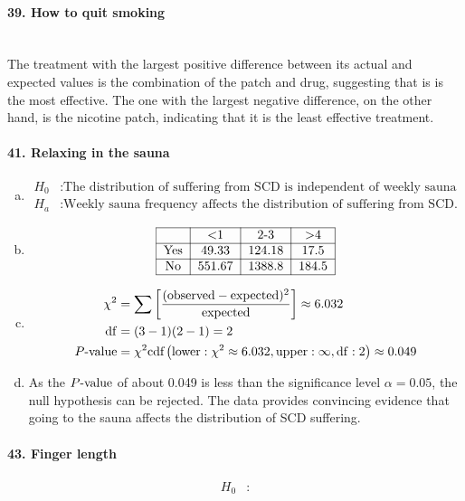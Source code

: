 \documentclass[../Homework]{subfiles}
\begin{document}
		\paragraph{39. How to quit smoking}\ \\
			The treatment with the largest positive difference between its actual and expected values is the combination of the patch and drug, suggesting that is is the most effective. The one with the largest negative difference, on the other hand, is the nicotine patch, indicating that it is the least effective treatment.
		\paragraph{41. Relaxing in the sauna}
			\begin{enumerate}[a.]
				\item
					\begin{align*}
						H_0&: \text{The distribution of suffering from SCD is independent of weekly sauna frequency.} \\
						H_a&: \text{Weekly sauna frequency affects the distribution of suffering from SCD.}
					\end{align*}
				\item
					\[\begin{tabular}{|c|c|c|c|}\hline
						& <1 & 2-3 & >4 \\\hline
						Yes & 49.33 & 124.18 & 17.5 \\\hline
						No & 551.67 & 1388.8 & 184.5 \\\hline
					\end{tabular}\]
				\item
					\begin{align*}
						\chi^2 &= \sum\left[\mathrm{\frac{(observed - expected)^2}{expected}}\right] \approx 6.032 \\
						\operatorname{df} &= (3 - 1)(2 - 1) = 2 \\
						P\text{-value} &= \chi^2\text{cdf}\left(\operatorname{lower}: \chi^2 \approx 6.032, \operatorname{upper}: \infty, \operatorname{df}: 2\right) \approx 0.049
					\end{align*}
				\item
					As the $P\text{-value}$ of about 0.049 is less than the significance level $\alpha = 0.05$, the null hypothesis can be rejected. The data provides convincing evidence that going to the sauna affects the distribution of SCD suffering.
			\end{enumerate}
		\paragraph{43. Finger length}
			\begin{align*}
				H_0&:
			\end{align*}
\end{document}
